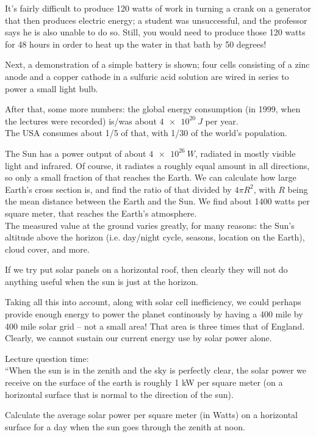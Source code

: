 \documentclass[12pt,a4paper]{report}
\begin{document}
It's fairly difficult to produce 120 watts of work in turning a crank on a generator that then produces electric energy; a student was unsuccessful, and the professor says he is also unable to do so. Still, you would need to produce those 120 watts for 48 hours in order to heat up the water in that bath by 50 degrees!

Next, a demonstration of a simple battery is shown; four cells consisting of a zinc anode and a copper cathode in a sulfuric acid solution are wired in series to power a small light bulb.

After that, some more numbers: the global energy consumption (in 1999, when the lectures were recorded) is/was about $\SI{4e20}{J}$ per year.\\
The USA consumes about 1/5 of that, with 1/30 of the world's population.

The Sun has a power output of about $\SI{4e26}{W}$, radiated in mostly visible light and infrared. Of course, it radiates a roughly equal amount in all directions, so only a small fraction of that reaches the Earth. We can calculate how large Earth's cross section is, and find the ratio of that divided by $4 \pi R^2$, with $R$ being the mean distance between the Earth and the Sun. We find about 1400 watts per square meter, that reaches the Earth's atmosphere.\\
The measured value at the ground varies greatly, for many reasons: the Sun's altitude above the horizon (i.e. day/night cycle, seasons, location on the Earth), cloud cover, and more.

If we try put solar panels on a horizontal roof, then clearly they will not do anything useful when the sun is just at the horizon.

Taking all this into account, along with solar cell inefficiency, we could perhaps provide enough energy to power the planet continously by having a 400 mile by 400 mile solar grid -- not a small area! That area is three times that of England. Clearly, we cannot sustain our current energy use by solar power alone.

Lecture question time:\\
``When the sun is in the zenith and the sky is perfectly clear, the solar power we receive on the surface of the earth is roughly 1 kW per square meter (on a horizontal surface that is normal to the direction of the sun).

Calculate the average solar power per square meter (in Watts) on a horizontal surface for a day when the sun goes through the zenith at noon.
\end{document}
